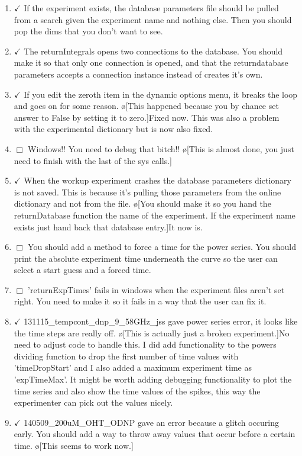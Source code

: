 \documentclass[10pt]{book}
\begin{document}
\begin{enumerate}
    \item $\checkmark$ If the experiment exists, the database parameters file should be pulled from a search given the experiment name and nothing else. Then you should pop the dims that you don't want to see. 
    \item $\checkmark$ The returnIntegrals opens two connections to the database. You should make it so that only one connection is opened, and that the returndatabase parameters accepts a connection instance instead of creates it's own.
    \item $\checkmark$ If you edit the zeroth item in the dynamic options menu, it breaks the loop and goes on for some reason. \o[This happened because you by chance set answer to False by setting it to zero.]{Fixed now. This was also a problem with the experimental dictionary but is now also fixed.} 
    \item $\Box$ Windows!! You need to debug that bitch!! \o[This is almost done, you just need to finish with the last of the sys calls.]{}
    \item $\checkmark$ When the workup experiment crashes the database parameters dictionary is not saved. This is because it's pulling those parameters from the online dictionary and not from the file. \o[You should make it so you hand the returnDatabase function the name of the experiment. If the experiment name exists just hand back that database entry.]{It now is.}
    \item $\Box$ You should add a method to force a time for the power series. You should print the absolute experiment time underneath the curve so the user can select a start guess and a forced time.
    \item $\Box$ 'returnExpTimes' fails in windows when the experiment files aren't set right. You need to make it so it fails in a way that the user can fix it.
    \item $\checkmark$ 131115_tempcont_dnp_9_58GHz_jss gave power series error, it looks like the time steps are really off. \o[This is actually just a broken experiment.]{No need to adjust code to handle this. I did add functionality to the powers dividing function to drop the first number of time values with 'timeDropStart' and I also added a maximum experiment time as 'expTimeMax'. It might be worth adding debugging functionality to plot the time series and also show the time values of the spikes, this way the experimenter can pick out the values nicely.}
    \item $\checkmark$ 140509_200uM_OHT_ODNP gave an error because a glitch occuring early. You should add a way to throw away values that occur before a certain time. \o[This seems to work now.]{}

\end{enumerate}
\end{document}
